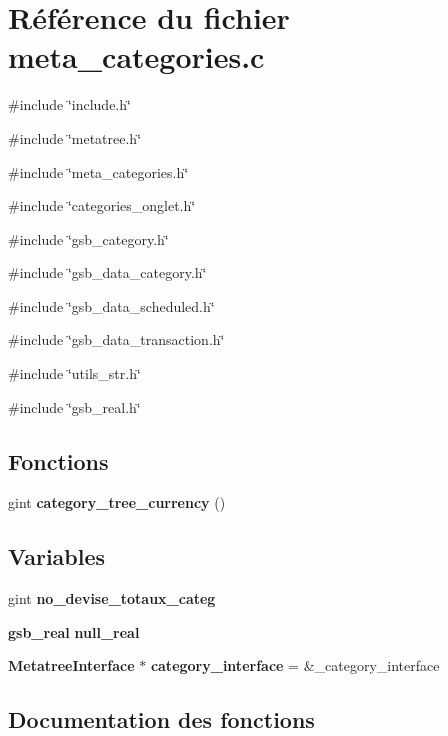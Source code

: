 \section{Référence du fichier meta\_\-categories.c}
\label{meta__categories_8c}
{\ttfamily \#include \char`\"{}include.h\char`\"{}}\par
{\ttfamily \#include \char`\"{}metatree.h\char`\"{}}\par
{\ttfamily \#include \char`\"{}meta\_\-categories.h\char`\"{}}\par
{\ttfamily \#include \char`\"{}categories\_\-onglet.h\char`\"{}}\par
{\ttfamily \#include \char`\"{}gsb\_\-category.h\char`\"{}}\par
{\ttfamily \#include \char`\"{}gsb\_\-data\_\-category.h\char`\"{}}\par
{\ttfamily \#include \char`\"{}gsb\_\-data\_\-scheduled.h\char`\"{}}\par
{\ttfamily \#include \char`\"{}gsb\_\-data\_\-transaction.h\char`\"{}}\par
{\ttfamily \#include \char`\"{}utils\_\-str.h\char`\"{}}\par
{\ttfamily \#include \char`\"{}gsb\_\-real.h\char`\"{}}\par
\subsection*{Fonctions}
\begin{DoxyCompactItemize}
\item 
gint {\bf category\_\-tree\_\-currency} ()
\end{DoxyCompactItemize}
\subsection*{Variables}
\begin{DoxyCompactItemize}
\item 
gint {\bf no\_\-devise\_\-totaux\_\-categ}
\item 
{\bf gsb\_\-real} {\bf null\_\-real}
\item 
{\bf MetatreeInterface} $\ast$ {\bf category\_\-interface} = \&\_\-category\_\-interface
\end{DoxyCompactItemize}


\subsection{Documentation des fonctions}
